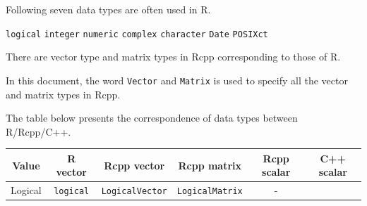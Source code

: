 \documentclass[]{book}
\begin{document}
Following seven data types are often used in R.

\texttt{logical} \texttt{integer} \texttt{numeric} \texttt{complex} \texttt{character} \texttt{Date} \texttt{POSIXct}

There are vector type and matrix types in Rcpp corresponding to those of R.

In this document, the word \texttt{Vector} and \texttt{Matrix} is used to specify all the vector and matrix types in Rcpp.

The table below presents the correspondence of data types between R/Rcpp/C++.

\begin{longtable}[]{@{}cccccc@{}}
\toprule
\begin{minipage}[b]{0.14\columnwidth}\centering
Value\strut
\end{minipage} & \begin{minipage}[b]{0.14\columnwidth}\centering
R vector\strut
\end{minipage} & \begin{minipage}[b]{0.14\columnwidth}\centering
Rcpp vector\strut
\end{minipage} & \begin{minipage}[b]{0.14\columnwidth}\centering
Rcpp matrix\strut
\end{minipage} & \begin{minipage}[b]{0.14\columnwidth}\centering
Rcpp scalar\strut
\end{minipage} & \begin{minipage}[b]{0.14\columnwidth}\centering
C++ scalar\strut
\end{minipage}\tabularnewline
\midrule
\endhead
\begin{minipage}[t]{0.14\columnwidth}\centering
Logical\strut
\end{minipage} & \begin{minipage}[t]{0.14\columnwidth}\centering
\texttt{logical}\strut
\end{minipage} & \begin{minipage}[t]{0.14\columnwidth}\centering
\texttt{LogicalVector}\strut
\end{minipage} & \begin{minipage}[t]{0.14\columnwidth}\centering
\texttt{LogicalMatrix}\strut
\end{minipage} & \begin{minipage}[t]{0.14\columnwidth}\centering
-\strut
\end{minipage} & \begin{minipage}[t]{0.14\columnwidth}\centering

\end{minipage}
\end{longtable}
\end{document}
